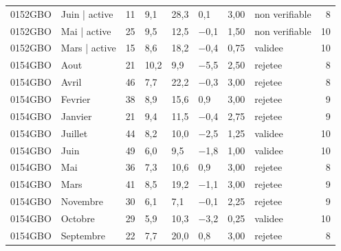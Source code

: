 \begin{table}[htbp]
\begin{tabular}{llrlllllr}
0152GBO & Juin | active & 11 & 9,1 & 28,3 & 0,1 & 3,00 & non verifiable & 8 \\
0152GBO & Mai | active & 25 & 9,5 & 12,5 & −0,1 & 1,50 & non verifiable & 10 \\
0152GBO & Mars | active & 15 & 8,6 & 18,2 & −0,4 & 0,75 & validee & 10 \\
0154GBO & Aout & 21 & 10,2 & 9,9 & −5,5 & 2,50 & rejetee & 8 \\
0154GBO & Avril & 46 & 7,7 & 22,2 & −0,3 & 3,00 & rejetee & 8 \\
0154GBO & Fevrier & 38 & 8,9 & 15,6 & 0,9 & 3,00 & rejetee & 9 \\
0154GBO & Janvier & 21 & 9,4 & 11,5 & −0,4 & 2,75 & rejetee & 9 \\
0154GBO & Juillet & 44 & 8,2 & 10,0 & −2,5 & 1,25 & validee & 10 \\
0154GBO & Juin & 49 & 6,0 & 9,5 & −1,8 & 1,00 & validee & 10 \\
0154GBO & Mai & 36 & 7,3 & 10,6 & 0,9 & 3,00 & rejetee & 8 \\
0154GBO & Mars & 41 & 8,5 & 19,2 & −1,1 & 3,00 & rejetee & 9 \\
0154GBO & Novembre & 30 & 6,1 & 7,1 & −0,1 & 2,25 & rejetee & 9 \\
0154GBO & Octobre & 29 & 5,9 & 10,3 & −3,2 & 0,25 & validee & 10 \\
0154GBO & Septembre & 22 & 7,7 & 20,0 & 0,8 & 3,00 & rejetee & 8 \\
\bottomrule
\end{tabular}
\end{table}
